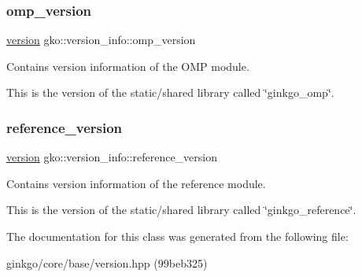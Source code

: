 \subsubsection{\texorpdfstring{omp\+\_\+version}{omp\_version}}
{\footnotesize\ttfamily \hyperlink{structgko_1_1version}{version} gko\+::version\+\_\+info\+::omp\+\_\+version}



Contains version information of the O\+MP module. 

This is the version of the static/shared library called \char`\"{}ginkgo\+\_\+omp\char`\"{}. \mbox{\label{classgko_1_1version__info_a772fcf25f93d719b733602b4bba7d7ec}} 
\subsubsection{\texorpdfstring{reference\+\_\+version}{reference\_version}}
{\footnotesize\ttfamily \hyperlink{structgko_1_1version}{version} gko\+::version\+\_\+info\+::reference\+\_\+version}



Contains version information of the reference module. 

This is the version of the static/shared library called \char`\"{}ginkgo\+\_\+reference\char`\"{}. 

The documentation for this class was generated from the following file\+:\begin{DoxyCompactItemize}
\item 
ginkgo/core/base/version.\+hpp (99beb325)\end{DoxyCompactItemize}

